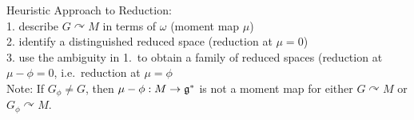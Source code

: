 \documentclass[handout,10pt]{beamer}
\begin{document}
{\begin{center}
	\end{center}
	\item Heuristic Approach to Reduction:
	\\1. describe $G\curvearrowright M$ in terms of $\omega$ 	\hspace{1cm}
	({\color{green}moment map $\mu$})
	\\2. identify a distinguished reduced space \hspace{1cm}
	({\color{green}reduction at $\mu=0$})
	\\3. use the ambiguity in 1.\ to obtain a family of reduced spaces \hspace{1cm}
	({\color{green}reduction at $\mu-\phi=0$, i.e.\ reduction at $\mu=\phi$}
	\\
	{\tiny Note: If $G_\phi\neq G$, then $\mu-\phi:M\to\mathfrak{g}^*$ is not a moment map for either $G\curvearrowright M$ or $G_\phi\curvearrowright M$.}
	
}

\end{document}
